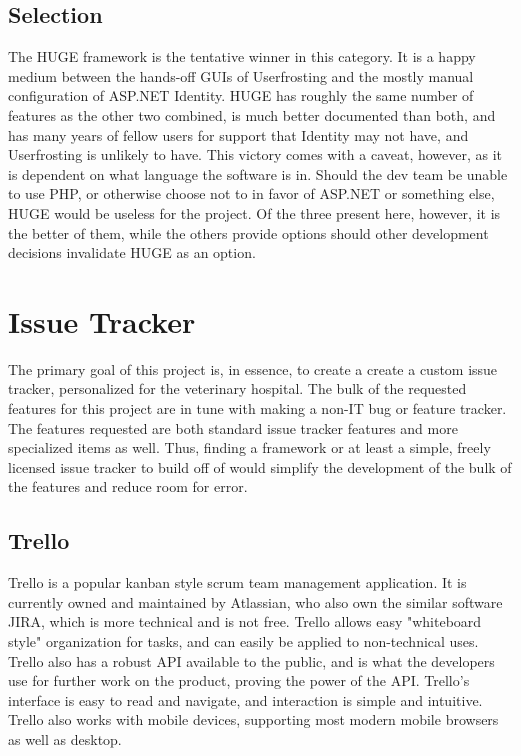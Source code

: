 \documentclass[onecolumn, draftclsnofoot,10pt, compsoc]{IEEEtran}
\begin{document}
\subsection{Selection}
The HUGE framework is the tentative winner in this category. It is a happy medium between the hands-off GUIs of Userfrosting and the mostly manual configuration of ASP.NET Identity.
HUGE has roughly the same number of features as the other two combined, is much better documented than both, and has many years of fellow users for support that Identity may
not have, and Userfrosting is unlikely to have. This victory comes with a caveat, however, as it is dependent on what language the software is in. Should the dev team be unable to
use PHP, or otherwise choose not to in favor of ASP.NET or something else, HUGE would be useless for the project. Of the three present here, however, it is the better of them, 
while the others provide options should other development decisions invalidate HUGE as an option.


\section{Issue Tracker}
The primary goal of this project is, in essence, to create a create a custom issue tracker, personalized for the veterinary hospital. The bulk of the requested features
for this project are in tune with making a non-IT bug or feature tracker. The features requested are both standard issue tracker features and more specialized items as 
well. Thus, finding a framework or at least a simple, freely licensed issue tracker to build off of would simplify the development of the bulk of the features and reduce
room for error.
\subsection{Trello}
Trello is a popular kanban style scrum team management application. It is currently owned and maintained by Atlassian, who also own the similar software JIRA, which is more 
technical and is not free. Trello allows easy "whiteboard style" organization for tasks, and can easily be applied to non-technical uses. Trello also has a robust API available 
to the public, and is what the developers use for further work on the product, proving the power of the API. Trello's interface is easy to read and navigate, and interaction
is simple and intuitive. Trello also works with mobile devices, supporting most modern mobile browsers as well as desktop.
\end{document}
